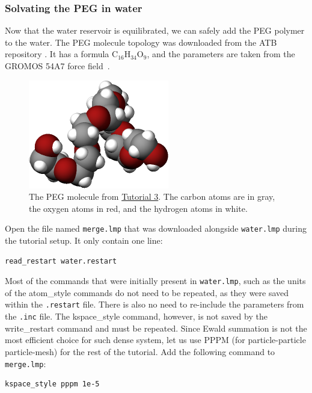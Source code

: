 \documentclass[9pt,tutorial]{livecoms}
\newcommand{\lmpcmd}[1]{\hspace{0pt}\colorbox{listing}{\textcolor{command}{\small{#1}}}\hspace{0pt}} %
\newcommand{\flecmd}[1]{\textcolor{command}{\texttt{#1}}} %
\begin{document}
\subsubsection{Solvating the PEG in water}

Now that the water reservoir is equilibrated, we can safely add the PEG polymer
to the water.  The PEG molecule topology was downloaded from the ATB repository
\cite{malde2011automated, oostenbrink2004biomolecular}.  It has a formula
$\text{C}_{16}\text{H}_{34}\text{O}_{9}$, and the parameters are taken from
the GROMOS 54A7 force field~\cite{schmid2011definition}.

\begin{figure}
\centering
\includegraphics[width=0.45\linewidth]{PEG-in-vacuum}
\caption{The PEG molecule from \hyperref[all-atom-label]{Tutorial 3}.
The carbon atoms are in gray, the oxygen
atoms in red, and the hydrogen atoms in white.}
\label{fig:PEG-in-vacuum}
\end{figure}

Open the file named \flecmd{merge.lmp} that was downloaded
alongside \flecmd{water.lmp} during the tutorial setup. It only contain one line:
\begin{lstlisting}
read_restart water.restart
\end{lstlisting}
Most of the commands that were initially present in \flecmd{water.lmp}, such as
the \lmpcmd{units} of the \lmpcmd{atom\_style} commands do not need to be repeated,
as they were saved within the \flecmd{.restart} file.  There is also no need to
re-include the parameters from the \flecmd{.inc} file.  The \lmpcmd{kspace\_style}
command, however, is not saved by the \lmpcmd{write\_restart} command and must be
repeated.  Since Ewald summation is not the most efficient choice for such dense
system, let us use PPPM (for particle-particle particle-mesh) for the rest
of the tutorial.  Add the following command to \flecmd{merge.lmp}:
\begin{lstlisting}
kspace_style pppm 1e-5
\end{lstlisting}
\end{document}
